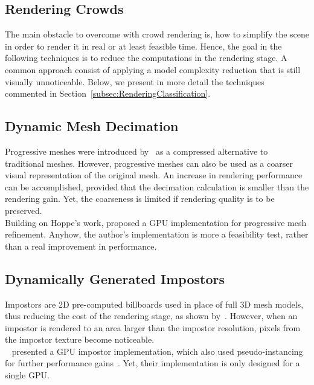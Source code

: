 \documentclass[6pt]{article} %
\begin{document}
\begin{multicols}{2}
\section{Rendering Crowds}

The main obstacle to overcome with crowd rendering is, how to simplify the scene in order to render it in real or at least feasible time.
Hence, the goal in the following techniques is to reduce the computations in the rendering stage.
A common approach consist of applying a model complexity reduction that is still visually unnoticeable.
Below, we present in more detail the techniques commented in Section~\ref{subsec:RenderingClassification}.

\subsection{Dynamic Mesh Decimation}

Progressive meshes were introduced by~\cite{Hoppe1996} as a compressed alternative to traditional meshes.
However, progressive meshes can also be used as a coarser visual representation of the original mesh.
An increase in rendering performance can be accomplished, provided that the decimation calculation is smaller than the rendering gain.
Yet, the coarseness is limited if rendering quality is to be preserved.\\

Building on Hoppe's work, \cite{Hu2009} proposed a GPU implementation for progressive mesh refinement.
Anyhow, the author's implementation is more a feasibility test, rather than a real improvement in performance.

\subsection{Dynamically Generated Impostors}
\label{subsec:DimGenImpostors}

Impostors are 2D pre-computed billboards used in place of full 3D mesh models, thus reducing the cost of the rendering stage, as shown by~\cite{Aubel2000}.
However, when an impostor is rendered to an area larger than the impostor resolution, pixels from the impostor texture become noticeable.\\

~\cite{Millan2006} presented a GPU impostor implementation, which also used pseudo-instancing for further performance gains~\cite{zelsnack2004glsl}.
Yet, their implementation is only designed for a single GPU.\\


\end{multicols}
\end{document}
